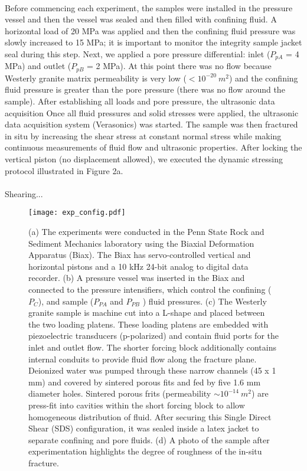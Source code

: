 \documentclass[letterpaper,10pt]{article}
\begin{document}
\paragraph{} Before commencing each experiment, the samples were installed in the pressure vessel and then the vessel was sealed and then filled with confining fluid. A horizontal load of 20 MPa was applied and then the confining fluid pressure was slowly increased to 15 MPa; it is important to monitor the integrity sample jacket seal during this step. Next, we applied a pore pressure differential: inlet ($P_{pA}$ = 4 MPa) and outlet ($P_{pB}$ = 2 MPa). At this point there was no flow because Westerly granite matrix permeability is very low ($< 10^{-20}\ m^2$) and the confining fluid pressure is greater than the pore pressure (there was no flow around the sample). After establishing all loads and pore pressure, the ultrasonic data acquisition Once all fluid pressures and solid stresses were applied, the ultrasonic data acquisition system (Verasonics\textsuperscript{\textregistered}) was started. The sample was then fractured in situ by increasing the shear stress at constant normal stress while making continuous measurements of fluid flow and ultrasonic properties. After locking the vertical piston (no displacement allowed), we executed the dynamic stressing protocol illustrated in Figure 2a.

\paragraph{} Shearing...

\newpage

\begin{figure*}[ht] 
	\centering 
	\texttt{[image: exp\_config.pdf]}
	\caption[]{(a) The experiments were conducted in the Penn State Rock and Sediment Mechanics laboratory using the Biaxial Deformation Apparatus (Biax). The Biax has servo-controlled vertical and horizontal pistons and a 10 kHz 24-bit analog to digital data recorder. (b) A pressure vessel was inserted in the Biax and connected to the pressure intensifiers, which control the confining ($P_C$), and sample ($P_{PA}$ and $P_{PB}$ ) fluid pressures. (c) The Westerly granite sample is machine cut into a L-shape and placed between the two loading platens. These loading platens are embedded with piezoelectric transducers (p-polarized) and contain fluid ports for the inlet and outlet flow. The shorter forcing block additionally contains internal conduits to provide fluid flow along the fracture plane. Deionized water was pumped through these narrow channels (45 x 1 mm) and covered by sintered porous fits and fed by five 1.6 mm diameter holes. Sintered porous frits (permeability $\sim 10^{-14}\ m^2$) are press-fit into cavities within the short forcing block to allow homogeneous distribution of fluid. After securing this Single Direct Shear (SDS) configuration, it was sealed inside a latex jacket to separate confining and pore fluids. (d) A photo of the sample after experimentation highlights the degree of roughness of the in-situ fracture.}
	\label{fig:samplesetup} 
\end{figure*}
\end{document}
